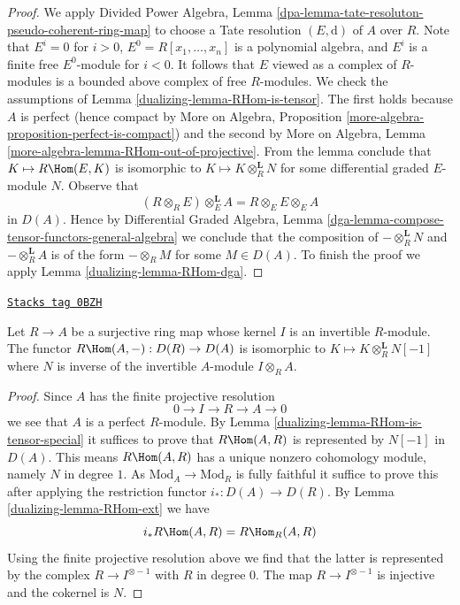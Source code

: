 \begin{proof}

We apply Divided Power Algebra, Lemma
\ref{dpa-lemma-tate-resoluton-pseudo-coherent-ring-map}
to choose a Tate resolution $(E, \text{d})$ of $A$ over $R$.
Note that $E^i = 0$ for $i > 0$, $E^0 = R[x_1, \ldots, x_n]$
is a polynomial algebra, and $E^i$ is a finite free $E^0$-module
for $i < 0$. It follows that $E$ viewed as a complex of $R$-modules
is a bounded above complex of free $R$-modules.
We check the assumptions of Lemma \ref{dualizing-lemma-RHom-is-tensor}.
The first holds because $A$ is perfect
(hence compact by More on Algebra, Proposition
\ref{more-algebra-proposition-perfect-is-compact})
and the second by
More on Algebra, Lemma \ref{more-algebra-lemma-RHom-out-of-projective}.
From the lemma conclude that $K \mapsto R\Hom(E, K)$ is
isomorphic to $K \mapsto K \otimes_R^\mathbf{L} N$ for
some differential graded $E$-module $N$. Observe that
$$
(R \otimes_R E) \otimes_E^\mathbf{L} A = R \otimes_E E \otimes_E A
$$
in $D(A)$. Hence by Differential Graded Algebra, Lemma
\ref{dga-lemma-compose-tensor-functors-general-algebra}
we conclude that the composition of
$- \otimes_R^\mathbf{L} N$ and $- \otimes_R^\mathbf{L} A$
is of the form $- \otimes_R M$ for some $M \in D(A)$.
To finish the proof we apply Lemma \ref{dualizing-lemma-RHom-dga}.
\end{proof}

\begin{lemma}
\label{dualizing-lemma-compute-for-effective-Cartier-algebraic}
\href{https://stacks.math.columbia.edu/tag/0BZH}{\texttt{Stacks tag 0BZH}}

Let $R \to A$ be a surjective ring map whose kernel $I$
is an invertible $R$-module. The functor
$R\Hom(A, -) : D(R) \to D(A)$
is isomorphic to $K \mapsto K \otimes_R^\mathbf{L} N[-1]$
where $N$ is inverse of the invertible $A$-module $I \otimes_R A$.
\end{lemma}

\begin{proof}

Since $A$ has the finite projective resolution
$$
0 \to I \to R \to A \to 0
$$
we see that $A$ is a perfect $R$-module. By
Lemma \ref{dualizing-lemma-RHom-is-tensor-special} it suffices
to prove that $R\Hom(A, R)$ is represented by $N[-1]$ in $D(A)$.
This means $R\Hom(A, R)$ has a unique nonzero
cohomology module, namely $N$ in degree $1$. As
$\text{Mod}_A \to \text{Mod}_R$ is fully faithful it suffice to prove
this after applying the restriction functor $i_* : D(A) \to D(R)$.
By Lemma \ref{dualizing-lemma-RHom-ext} we have
$$
i_*R\Hom(A, R) = R\Hom_R(A, R)
$$
Using the finite projective resolution above we find that the latter
is represented by the complex $R \to I^{\otimes -1}$ with $R$
in degree $0$. The map $R \to I^{\otimes -1}$ is injective
and the cokernel is $N$.
\end{proof}

